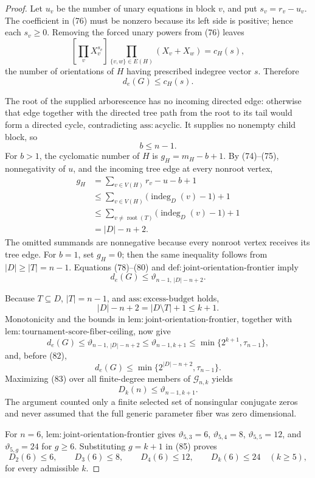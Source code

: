 \documentclass{article}
\begin{document}
\begin{proof}
Let \(u_v\) be the number of unary equations in block \(v\), and put \(s_v=r_v-u_v\).  The coefficient in (76) must be nonzero because its left side is positive; hence each \(s_v\geq0\).  Removing the forced unary powers from (76) leaves
\[
 [\prod_vX_v^{s_v}]\prod_{\{v,w\}\in E(H)}(X_v+X_w)=c_H(s),
\tag{77}
\]
the number of orientations of \(H\) having prescribed indegree vector \(s\).  Therefore
\[
 d_e(G)\leq c_H(s).
\tag{78}
\]

The root of the supplied arborescence has no incoming directed edge: otherwise that edge together with the directed tree path from the root to its tail would form a directed cycle, contradicting \(\mathrm{ass:acyclic}\).  It supplies no nonempty child block, so
\[
 b\leq n-1.
\tag{79}
\]
For \(b>1\), the cyclomatic number of \(H\) is \(g_H=m_H-b+1\).  By (74)--(75), nonnegativity of \(u\), and the incoming tree edge at every nonroot vertex,
\[
\begin{aligned}
 g_H
 &=\sum_{v\in V(H)}r_v-u-b+1\\
 &\leq\sum_{v\in V(H)}\bigl(\operatorname{indeg}_D(v)-1\bigr)+1\\
 &\leq\sum_{v\ne\operatorname{root}(T)}
       \bigl(\operatorname{indeg}_D(v)-1\bigr)+1\\
 &=|D|-n+2.
\end{aligned}
\tag{80}
\]
The omitted summands are nonnegative because every nonroot vertex receives its tree edge.  For \(b=1\), set \(g_H=0\); then the same inequality follows from \(|D|\geq|T|=n-1\).  Equations (78)--(80) and \(\mathrm{def:joint\mbox{-}orientation\mbox{-}frontier}\) imply
\[
 d_e(G)\leq\vartheta_{n-1,\,|D|-n+2}.
\tag{81}
\]

Because \(T\subseteq D\), \(|T|=n-1\), and \(\mathrm{ass:excess\mbox{-}budget}\) holds,
\[
 |D|-n+2=|D\setminus T|+1\leq k+1.
\tag{82}
\]
Monotonicity and the bounds in \(\mathrm{lem:joint\mbox{-}orientation\mbox{-}frontier}\), together with \(\mathrm{lem:tournament\mbox{-}score\mbox{-}fiber\mbox{-}ceiling}\), now give
\[
 d_e(G)
 \leq\vartheta_{n-1,\,|D|-n+2}
 \leq\vartheta_{n-1,k+1}
 \leq\min\{2^{k+1},\tau_{n-1}\},
\tag{83}
\]
and, before (82),
\[
 d_e(G)\leq\min\{2^{|D|-n+2},\tau_{n-1}\}.
\tag{84}
\]
Maximizing (83) over all finite-degree members of \(\mathcal G_{n,k}\) yields
\[
 D_k(n)\leq\vartheta_{n-1,k+1}.
\tag{85}
\]
The argument counted only a finite selected set of nonsingular conjugate zeros and never assumed that the full generic parameter fiber was zero dimensional.

For \(n=6\), \(\mathrm{lem:joint\mbox{-}orientation\mbox{-}frontier}\) gives \(\vartheta_{5,3}=6\), \(\vartheta_{5,4}=8\), \(\vartheta_{5,5}=12\), and \(\vartheta_{5,g}=24\) for \(g\geq6\).  Substituting \(g=k+1\) in (85) proves
\[
 D_2(6)\leq6,\qquad D_3(6)\leq8,\qquad D_4(6)\leq12,
 \qquad D_k(6)\leq24\quad(k\geq5),
\tag{86}
\]
for every admissible \(k\).
\end{proof}
\end{document}
